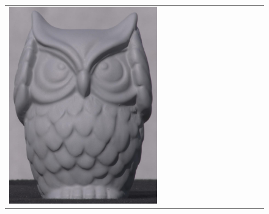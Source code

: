 \begin{figure}[!ht]
\begin{tabular}{@{}rcccccccccccc@{}}
    \includegraphics[width=\customwidth]{./figures/reconstruction/object/133215.jpg} &

\end{tabular}
\end{figure}

